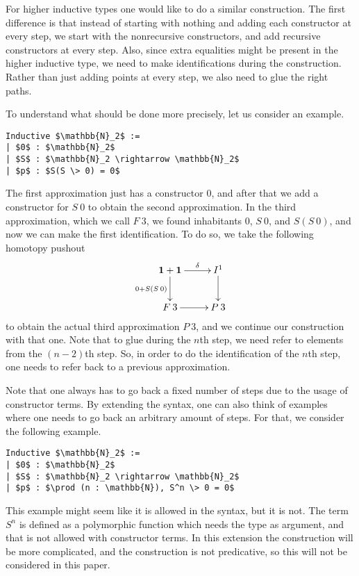 \documentclass[a4paper,UKenglish]{lipics-v2016}
\newcommand{\one}[0]{\textbf{1}}
\begin{document}
For higher inductive types one would like to do a similar construction.
The first difference is that instead of starting with nothing and adding each constructor at every step, we start with the nonrecursive constructors, and add recursive constructors at every step.
Also, since extra equalities might be present in the higher inductive type, we need to make identifications during the construction.
Rather than just adding points at every step, we also need to glue the right paths.

To understand what should be done more precisely, let us consider an example.
\lstset{language=Coq}
\begin{lstlisting}
Inductive $\mathbb{N}_2$ :=
| $0$ : $\mathbb{N}_2$
| $S$ : $\mathbb{N}_2 \rightarrow \mathbb{N}_2$
| $p$ : $S(S \> 0) = 0$
\end{lstlisting}
The first approximation just has a constructor $0$, and after that we add a constructor for $S \> 0$ to obtain the second approximation.
In the third approximation, which we call $F \> 3$, we found inhabitants $0$, $S \> 0$, and $S(S \> 0)$, and now we can make the first identification.
To do so, we take the following homotopy pushout
\[
\xymatrix
{
	\one + \one \ar[d]_{0 + S(S \> 0)} \ar[r]^-{\delta} & I^1 \ar[d]\\
	F \> 3\ar[r] & P \> 3
}
\]
to obtain the actual third approximation $P \> 3$, and we continue our construction with that one.
Note that to glue during the $n$th step, we need refer to elements from the $(n-2)$th step.
So, in order to do the identification of the $n$th step, one needs to refer back to a previous approximation.

Note that one always has to go back a fixed number of steps due to the usage of constructor terms.
By extending the syntax, one can also think of examples where one needs to go back an arbitrary amount of steps.
For that, we consider the following example.
\lstset{language=Coq}
\begin{lstlisting}
Inductive $\mathbb{N}_2$ :=
| $0$ : $\mathbb{N}_2$
| $S$ : $\mathbb{N}_2 \rightarrow \mathbb{N}_2$
| $p$ : $\prod (n : \mathbb{N}), S^n \> 0 = 0$
\end{lstlisting}
This example might seem like it is allowed in the syntax, but it is not.
The term $S^n$ is defined as a polymorphic function which needs the type as argument, and that is not allowed with constructor terms.
In this extension the construction will be more complicated, and the construction is not predicative, so this will not be considered in this paper.
\end{document}

